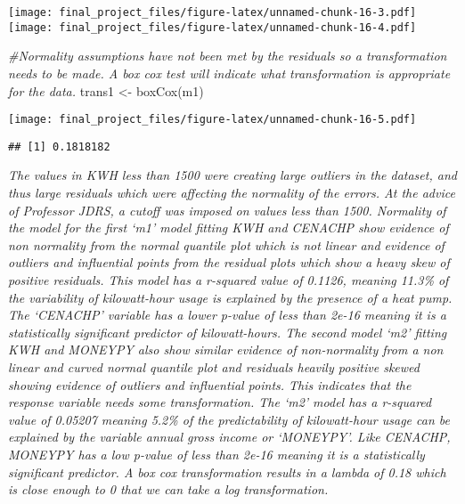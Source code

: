 \documentclass[
]{article}
\newenvironment{Shaded}{\begin{snugshade}}{\end{snugshade}}
\newcommand{\CommentTok}[1]{\textcolor[rgb]{0.56,0.35,0.01}{\textit{#1}}}
\newcommand{\FunctionTok}[1]{\textcolor[rgb]{0.00,0.00,0.00}{#1}}
\newcommand{\NormalTok}[1]{#1}
\newcommand{\OtherTok}[1]{\textcolor[rgb]{0.56,0.35,0.01}{#1}}
\newcommand{\SpecialCharTok}[1]{\textcolor[rgb]{0.00,0.00,0.00}{#1}}
\begin{document}
\texttt{[image: final\_project\_files/figure-latex/unnamed-chunk-16-3.pdf]}
\texttt{[image: final\_project\_files/figure-latex/unnamed-chunk-16-4.pdf]}

\begin{Shaded}
\begin{Highlighting}[]
\CommentTok{\#Normality assumptions have not been met by the residuals so a transformation needs to be made. A box cox test will indicate what transformation is appropriate for the data. }
\NormalTok{trans1 }\OtherTok{\textless{}{-}} \FunctionTok{boxCox}\NormalTok{(m1)}
\end{Highlighting}
\end{Shaded}

\texttt{[image: final\_project\_files/figure-latex/unnamed-chunk-16-5.pdf]}

\begin{Shaded}
\end{Shaded}

\begin{verbatim}
## [1] 0.1818182
\end{verbatim}

\emph{The values in KWH less than 1500 were creating large outliers in
the dataset, and thus large residuals which were affecting the normality
of the errors. At the advice of Professor JDRS, a cutoff was imposed on
values less than 1500. Normality of the model for the first `m1' model
fitting KWH and CENACHP show evidence of non normality from the normal
quantile plot which is not linear and evidence of outliers and
influential points from the residual plots which show a heavy skew of
positive residuals. This model has a r-squared value of 0.1126, meaning
11.3\% of the variability of kilowatt-hour usage is explained by the
presence of a heat pump. The `CENACHP' variable has a lower p-value of
less than 2e-16 meaning it is a statistically significant predictor of
kilowatt-hours. The second model `m2' fitting KWH and MONEYPY also show
similar evidence of non-normality from a non linear and curved normal
quantile plot and residuals heavily positive skewed showing evidence of
outliers and influential points. This indicates that the response
variable needs some transformation. The `m2' model has a r-squared value
of 0.05207 meaning 5.2\% of the predictability of kilowatt-hour usage
can be explained by the variable annual gross income or `MONEYPY'. Like
CENACHP, MONEYPY has a low p-value of less than 2e-16 meaning it is a
statistically significant predictor. A box cox transformation results in
a lambda of 0.18 which is close enough to 0 that we can take a log
transformation. }
\end{document}
